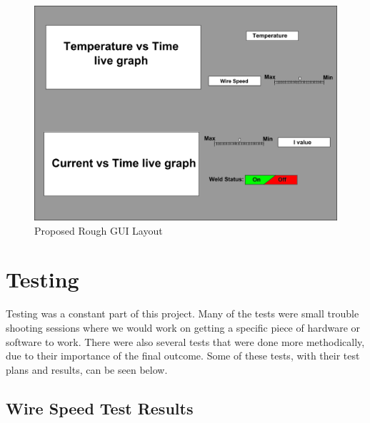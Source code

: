 \documentclass[12pt]{article}
\newlength\tindent
\renewcommand{\indent}{\hspace*{\tindent}}
\begin{document}
\begin{figure}[h]
\centering
\includegraphics[scale=0.5]{gui}
\caption{Proposed Rough GUI Layout}
\end{figure}

\clearpage

\section{Testing}
\indent Testing was a constant part of this project. Many of the tests were small trouble shooting sessions where we would work on getting a specific piece of hardware or software to work. There were also several tests that were done more methodically, due to their importance of the final outcome. Some of these tests, with their test plans and results, can be seen below.

\subsection{Wire Speed Test Results}



\clearpage
\end{document}
